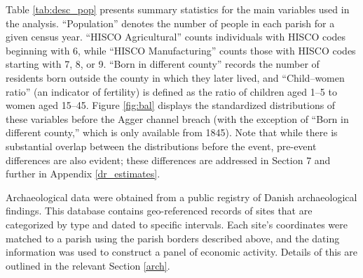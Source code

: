 \documentclass[12pt]{article}
\begin{document}
Table \ref{tab:desc_pop} presents summary statistics for the main variables used in the analysis. “Population” denotes the number of people in each parish for a given census year. “HISCO Agricultural” counts individuals with HISCO codes beginning with 6, while “HISCO Manufacturing” counts those with HISCO codes starting with 7, 8, or 9. “Born in different county” records the number of residents born outside the county in which they later lived, and “Child–women ratio” (an indicator of fertility) is defined as the ratio of children aged 1–5 to women aged 15–45. Figure \ref{fig:bal} displays the standardized distributions of these variables before the Agger channel breach (with the exception of “Born in different county,” which is only available from 1845). Note that while there is substantial overlap between the distributions before the event, pre-event differences are also evident; these differences are addressed in Section 7 and further in Appendix \ref{dr_estimates}.

Archaeological data were obtained from a public registry of Danish archaeological findings. This database contains geo-referenced records of sites that are categorized by type and dated to specific intervals. Each site's coordinates were matched to a parish using the parish borders described above, and the dating information was used to construct a panel of economic activity. Details of this are outlined in the relevant Section \ref{arch}.

\FloatBarrier

\begin{table}
\centering
\caption{Summary statistics for parish level census data}
\label{tab:desc_pop} 
\footnotesize

\parbox{0.9\textwidth}{
\caption*{\footnotesize \textit{Notes:} This table contains summary statistics for the variables used, which are ultimately sourced from the census data. For most variables, there are 14,301 observations corresponding to 1,589 parishes and 9 census years. The child–women ratio is defined as the ratio of children aged 1–5 to women aged 15–45; 27 observations are missing from this variable since no women in the relevant age group are observed. 'Born in different county' is only observed from 1845 onward. \\ \textit{Source: Danish census data}}
}
\end{table}
\end{document}
